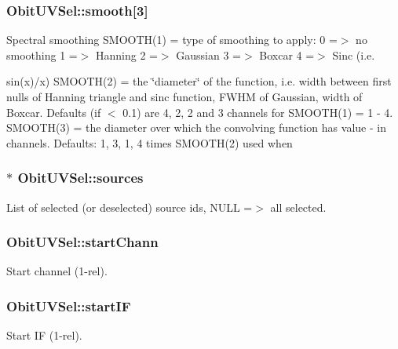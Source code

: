 \subsubsection{ {\bf Obit\-UVSel::smooth}[3]}\label{structObitUVSel_o33}


Spectral smoothing SMOOTH(1) = type of smoothing to apply: 0 =$>$ no smoothing 1 =$>$ Hanning 2 =$>$ Gaussian 3 =$>$ Boxcar 4 =$>$ Sinc (i.e. 

sin(x)/x) SMOOTH(2) = the \char`\"{}diameter\char`\"{} of the function, i.e. width between first nulls of Hanning triangle and sinc function, FWHM of Gaussian, width of Boxcar. Defaults (if $<$ 0.1) are 4, 2, 2 and 3 channels for SMOOTH(1) = 1 - 4. SMOOTH(3) = the diameter over which the convolving function has value - in channels. Defaults: 1, 3, 1, 4 times SMOOTH(2) used when 
\subsubsection{$\ast$ {\bf Obit\-UVSel::sources}}\label{structObitUVSel_o29}


List of selected (or deselected) source ids, NULL =$>$ all selected. 

\subsubsection{ {\bf Obit\-UVSel::start\-Chann}}\label{structObitUVSel_o12}


Start channel (1-rel). 

\subsubsection{ {\bf Obit\-UVSel::start\-IF}}\label{structObitUVSel_o15}


Start IF (1-rel). 

